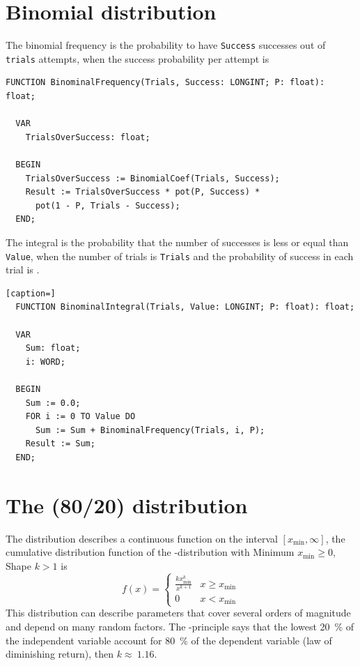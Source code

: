 \begin{refsection}
\section{Binomial distribution}

The binomial frequency is the probability to have \texttt{Success} successes out of \texttt{trials} attempts, when the success probability per attempt is 

\begin{lstlisting}[caption=Routines for the binomial distribution]
  FUNCTION BinominalFrequency(Trials, Success: LONGINT; P: float): float;

  VAR
    TrialsOverSuccess: float;

  BEGIN
    TrialsOverSuccess := BinomialCoef(Trials, Success);
    Result := TrialsOverSuccess * pot(P, Success) *
      pot(1 - P, Trials - Success);
  END;
\end{lstlisting}

The integral is the probability that the number of successes is less or equal than \texttt{Value}, when the number of trials is \texttt{Trials} and the probability of success in each trial is .

\begin{lstlisting}[caption=]
  FUNCTION BinominalIntegral(Trials, Value: LONGINT; P: float): float;

  VAR
    Sum: float;
    i: WORD;

  BEGIN
    Sum := 0.0;
    FOR i := 0 TO Value DO
      Sum := Sum + BinominalFrequency(Trials, i, P);
    Result := Sum;
  END;
\end{lstlisting}

\section{The  (80/20) distribution}

The  distribution \parencite{Par-87} describes a continuous function on the interval \([x_\mathrm{min}, \infty]\), the cumulative distribution function of the -distribution with Minimum \(x_\mathrm{min} \geq 0 \), Shape \(k > 1 \) is
\begin{equation}
  f(x) = \left\{
     \begin{array}{lr}
         \frac{k x_\mathrm{min}^k}{x^{k+1}} & x \geq x_\mathrm{min} \\
         0                                  & x < x_\mathrm{min}
     \end{array}
  \right.
\end{equation}
This distribution can describe parameters that cover several orders of magnitude and depend on many random factors. The -principle says that the lowest \SI{20}{\%} of the independent variable account for \SI{80}{\%} of the dependent variable (law of diminishing return), then \(k \approx\ 1.16\).



\end{refsection}
